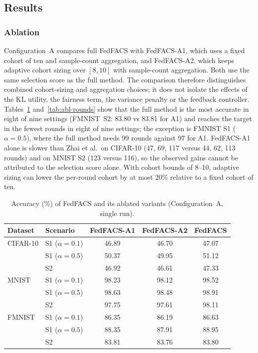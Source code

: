 \documentclass[pdflatex,sn-basic]{sn-jnl}
\begin{document}
\subsection{Results}\label{sec5.4}

\subsubsection{Ablation}
Configuration~A compares full FedFACS with FedFACS-A1, which uses a fixed cohort of ten and sample-count aggregation, and FedFACS-A2, which keeps adaptive cohort sizing over $[8,10]$ with sample-count aggregation. Both use the same selection score as the full method. The comparison therefore distinguishes combined cohort-sizing and aggregation choices; it does not isolate the effects of the KL utility, the fairness term, the variance penalty or the feedback controller. Tables~\ref{tab:abl-acc} and~\ref{tab:abl-rounds} show that the full method is the most accurate in eight of nine settings (FMNIST~S2: 83.80 vs 83.81 for A1) and reaches the target in the fewest rounds in eight of nine settings; the exception is FMNIST S1 ($\alpha=0.5$), where the full method needs 99 rounds against 97 for A1. FedFACS-A1 alone is slower than Zhai et al.\ on CIFAR-10 (47, 69, 117 versus 44, 62, 113 rounds) and on MNIST S2 (123 versus 116), so the observed gains cannot be attributed to the selection score alone. With cohort bounds of 8--10, adaptive sizing can lower the per-round cohort by at most 20\% relative to a fixed cohort of ten.

\begin{table}[t]
\caption{Accuracy (\%) of FedFACS and its ablated variants (Configuration~A, single run).}\label{tab:abl-acc}
\centering
\begin{tabular}{llccc}
\toprule
Dataset & Scenario & FedFACS-A1 & FedFACS-A2 & FedFACS\\
\midrule
CIFAR-10 & S1 ($\alpha=0.1$) & 46.89 & 46.70 & 47.07\\
 & S1 ($\alpha=0.5$) & 50.37 & 49.95 & 51.12\\
 & S2 & 46.92 & 46.61 & 47.33\\
MNIST & S1 ($\alpha=0.1$) & 98.23 & 98.12 & 98.52\\
 & S1 ($\alpha=0.5$) & 98.63 & 98.48 & 98.91\\
 & S2 & 97.75 & 97.61 & 98.11\\
FMNIST & S1 ($\alpha=0.1$) & 86.35 & 86.19 & 86.63\\
 & S1 ($\alpha=0.5$) & 88.35 & 87.91 & 88.95\\
 & S2 & 83.81 & 83.76 & 83.80\\
\bottomrule
\end{tabular}
\end{table}
\end{document}
